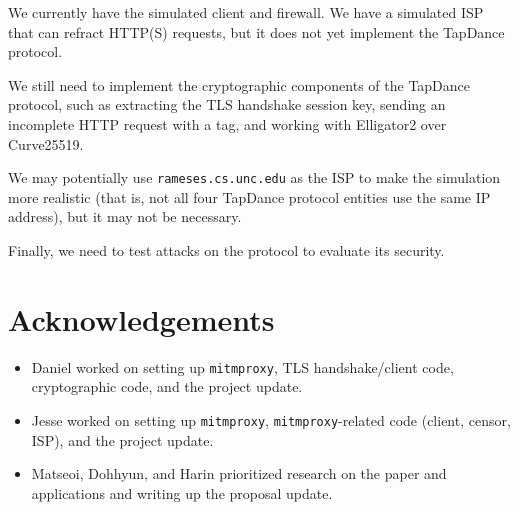 \documentclass[conference]{IEEEtran}
\begin{document}
We currently have the simulated client and firewall. We have a simulated ISP that can refract HTTP(S) requests, but it does not yet implement the TapDance protocol. 

We still need to implement the cryptographic components of the TapDance protocol, such as extracting the TLS handshake session key, sending an incomplete HTTP request with a tag, and working with Elligator2 over Curve25519. 

We may potentially use \texttt{rameses.cs.unc.edu} as the ISP to make the simulation more realistic (that is, not all four TapDance protocol entities use the same IP address), but it may not be necessary.

Finally, we need to test attacks on the protocol to evaluate its security.

\section{Acknowledgements}
\begin{itemize}
    \item Daniel worked on setting up \texttt{mitmproxy}, TLS handshake/client code, cryptographic code, and the project update.
    \item Jesse worked on setting up \texttt{mitmproxy}, \texttt{mitmproxy}-related code (client, censor, ISP), and the project update.
    \item Matseoi, Dohhyun, and Harin prioritized research on the paper and applications and writing up the proposal update. 
\end{itemize}

\printbibliography
\end{document}

